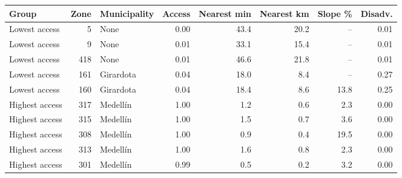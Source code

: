 \begin{tabular}{lrlrrrrr}
\toprule
Group & Zone & Municipality & Access & Nearest min & Nearest km & Slope \% & Disadv. \\
\midrule
Lowest access & 5 & None & 0.00 & 43.4 & 20.2 & -- & 0.01 \\
Lowest access & 9 & None & 0.01 & 33.1 & 15.4 & -- & 0.01 \\
Lowest access & 418 & None & 0.01 & 46.6 & 21.8 & -- & 0.01 \\
Lowest access & 161 & Girardota & 0.04 & 18.0 & 8.4 & -- & 0.27 \\
Lowest access & 160 & Girardota & 0.04 & 18.4 & 8.6 & 13.8 & 0.25 \\
Highest access & 317 & Medellín & 1.00 & 1.2 & 0.6 & 2.3 & 0.00 \\
Highest access & 315 & Medellín & 1.00 & 1.5 & 0.7 & 3.6 & 0.00 \\
Highest access & 308 & Medellín & 1.00 & 0.9 & 0.4 & 19.5 & 0.00 \\
Highest access & 313 & Medellín & 1.00 & 1.6 & 0.8 & 2.3 & 0.00 \\
Highest access & 301 & Medellín & 0.99 & 0.5 & 0.2 & 3.2 & 0.00 \\
\bottomrule
\end{tabular}

